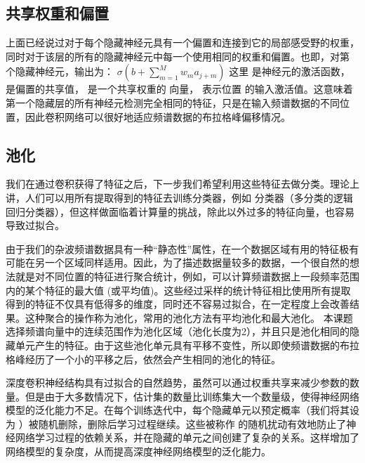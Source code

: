 \subsection{共享权重和偏置}
上面已经说过对于每个隐藏神经元具有一个偏置和连接到它的局部感受野的权重，同时对于该层的所有的隐藏神经元中每一个使用相同的权重和偏置。也即，对第 个隐藏神经元，输出为：
$\sigma(b+\sum_{m=1}^M w_m a_{j+m}) $
这里 是神经元的激活函数， 是偏置的共享值， 是一个共享权重的 向量， 表示位置 的输入激活值。这意味着第一个隐藏层的所有神经元检测完全相同的特征，只是在输入频谱数据的不同位置，因此卷积网络可以很好地适应频谱数据的布拉格峰偏移情况。

\subsection{池化}
我们在通过卷积获得了特征之后，下一步我们希望利用这些特征去做分类。理论上讲，人们可以用所有提取得到的特征去训练分类器，例如 分类器（多分类的逻辑回归分类器），但这样做面临着计算量的挑战，除此以外过多的特征向量，也容易导致过拟合。

由于我们的杂波频谱数据具有一种“静态性”属性，在一个数据区域有用的特征极有可能在另一个区域同样适用。因此，为了描述数据量较多的数据，一个很自然的想法就是对不同位置的特征进行聚合统计，例如，可以计算频谱数据上一段频率范围内的某个特征的最大值 (或平均值)。这些经过采样的统计特征相比使用所有提取得到的特征不仅具有低得多的维度，同时还不容易过拟合，在一定程度上会改善结果。这种聚合的操作称为池化，常用的池化方法有平均池化和最大池化。 本课题选择频谱向量中的连续范围作为池化区域（池化长度为2），并且只是池化相同的隐藏单元产生的特征。由于这些池化单元具有平移不变性，所以即使频谱数据的布拉格峰经历了一个小的平移之后，依然会产生相同的池化的特征。

深度卷积神经结构具有过拟合的自然趋势，虽然可以通过权重共享来减少参数的数量。但是由于大多数情况下，估计集的数量比训练集大一个数量级，使得神经网络模型的泛化能力不足。在每个训练迭代中，每个隐藏单元以预定概率（我们将其设为 ）被随机删除，删除后学习过程继续。这些被称作 的随机扰动有效地防止了神经网络学习过程的依赖关系，并在隐藏的单元之间创建了复杂的关系。这样增加了网络模型的复杂度，从而提高深度神经网络模型的泛化能力。
